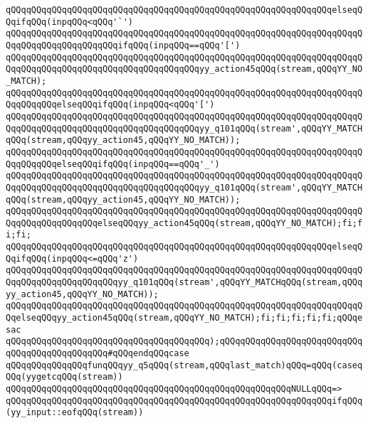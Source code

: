 \verb|qQQqqQQqqQQqqQQqqQQqqQQqqQQqqQQqqQQqqQQqqQQqqQQqqQQqqQQqqQQqqQQqelseqQQqifqQQq(inpqQQq<qQQq'`')|\newline
\verb|qQQqqQQqqQQqqQQqqQQqqQQqqQQqqQQqqQQqqQQqqQQqqQQqqQQqqQQqqQQqqQQqqQQqqQQqqQQqqQQqqQQqqQQqqQQqifqQQq(inpqQQq==qQQq'[')|\newline
\verb|qQQqqQQqqQQqqQQqqQQqqQQqqQQqqQQqqQQqqQQqqQQqqQQqqQQqqQQqqQQqqQQqqQQqqQQqqQQqqQQqqQQqqQQqqQQqqQQqqQQqqQQqqQQqyy_action45qQQq(stream,qQQqYY_NO_MATCH);|\newline
\verb|qQQqqQQqqQQqqQQqqQQqqQQqqQQqqQQqqQQqqQQqqQQqqQQqqQQqqQQqqQQqqQQqqQQqqQQqqQQqqQQqelseqQQqifqQQq(inpqQQq<qQQq'[')|\newline
\verb|qQQqqQQqqQQqqQQqqQQqqQQqqQQqqQQqqQQqqQQqqQQqqQQqqQQqqQQqqQQqqQQqqQQqqQQqqQQqqQQqqQQqqQQqqQQqqQQqqQQqqQQqqQQqyy_q101qQQq(stream',qQQqYY_MATCHqQQq(stream,qQQqyy_action45,qQQqYY_NO_MATCH));|\newline
\verb|qQQqqQQqqQQqqQQqqQQqqQQqqQQqqQQqqQQqqQQqqQQqqQQqqQQqqQQqqQQqqQQqqQQqqQQqqQQqqQQqelseqQQqifqQQq(inpqQQq==qQQq'_')|\newline
\verb|qQQqqQQqqQQqqQQqqQQqqQQqqQQqqQQqqQQqqQQqqQQqqQQqqQQqqQQqqQQqqQQqqQQqqQQqqQQqqQQqqQQqqQQqqQQqqQQqqQQqqQQqqQQqyy_q101qQQq(stream',qQQqYY_MATCHqQQq(stream,qQQqyy_action45,qQQqYY_NO_MATCH));|\newline
\verb|qQQqqQQqqQQqqQQqqQQqqQQqqQQqqQQqqQQqqQQqqQQqqQQqqQQqqQQqqQQqqQQqqQQqqQQqqQQqqQQqqQQqqQQqelseqQQqyy_action45qQQq(stream,qQQqYY_NO_MATCH);fi;fi;fi;|\newline
\verb|qQQqqQQqqQQqqQQqqQQqqQQqqQQqqQQqqQQqqQQqqQQqqQQqqQQqqQQqqQQqqQQqelseqQQqifqQQq(inpqQQq<=qQQq'z')|\newline
\verb|qQQqqQQqqQQqqQQqqQQqqQQqqQQqqQQqqQQqqQQqqQQqqQQqqQQqqQQqqQQqqQQqqQQqqQQqqQQqqQQqqQQqqQQqqQQqyy_q101qQQq(stream',qQQqYY_MATCHqQQq(stream,qQQqyy_action45,qQQqYY_NO_MATCH));|\newline
\verb|qQQqqQQqqQQqqQQqqQQqqQQqqQQqqQQqqQQqqQQqqQQqqQQqqQQqqQQqqQQqqQQqqQQqqQQqelseqQQqyy_action45qQQq(stream,qQQqYY_NO_MATCH);fi;fi;fi;fi;fi;qQQqesac|\newline
\verb|qQQqqQQqqQQqqQQqqQQqqQQqqQQqqQQqqQQqqQQq);qQQqqQQqqQQqqQQqqQQqqQQqqQQqqQQqqQQqqQQqqQQqqQQq#qQQqendqQQqcase|\newline
\verb|qQQqqQQqqQQqqQQqfunqQQqyy_q5qQQq(stream,qQQqlast_match)qQQq=qQQq(caseqQQq(yygetcqQQq(stream))|\newline
\verb|qQQqqQQqqQQqqQQqqQQqqQQqqQQqqQQqqQQqqQQqqQQqqQQqqQQqqQQqNULLqQQq=>|\newline
\verb|qQQqqQQqqQQqqQQqqQQqqQQqqQQqqQQqqQQqqQQqqQQqqQQqqQQqqQQqqQQqqQQqifqQQq(yy_input::eofqQQq(stream))|\newline
